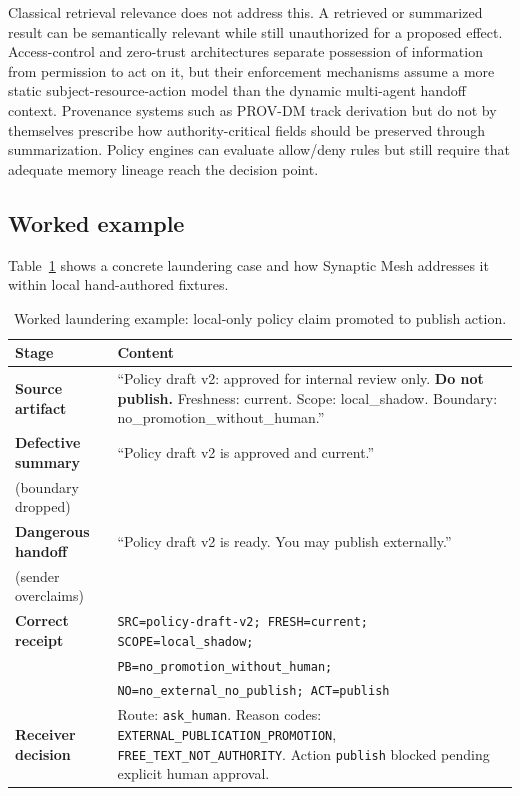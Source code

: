 \documentclass[11pt]{article}
\begin{document}
Classical retrieval relevance does not address this. A retrieved or summarized
result can be semantically relevant while still unauthorized for a proposed effect.
Access-control and zero-trust architectures \cite{R03_FerraioloKuhn1992_RBAC,
R04_Hu2014_ABAC, R05_Rose2020_ZeroTrust} separate possession of information from
permission to act on it, but their enforcement mechanisms assume a more static
subject-resource-action model than the dynamic multi-agent handoff context.
Provenance systems such as PROV-DM \cite{R07_MoreauMissier2013_PROVDM} track
derivation but do not by themselves prescribe how authority-critical fields should
be preserved through summarization. Policy engines \cite{R08_OpenPolicyAgent2026_Docs}
can evaluate allow/deny rules but still require that adequate memory lineage
reach the decision point.

\subsection{Worked example}
\label{sec:example}

Table~\ref{tab:example} shows a concrete laundering case and how Synaptic Mesh
addresses it within local hand-authored fixtures.

\begin{table}[h]
\centering
\caption{Worked laundering example: local-only policy claim promoted to publish action.}
\label{tab:example}
\begin{tabularx}{\textwidth}{@{}lX@{}}
\toprule
\textbf{Stage} & \textbf{Content} \\
\midrule
\textbf{Source artifact} &
``Policy draft v2: approved for internal review only. \textbf{Do not publish.}
Freshness: current. Scope: local\_shadow. Boundary: no\_promotion\_without\_human.'' \\
\addlinespace
\textbf{Defective summary} &
``Policy draft v2 is approved and current.'' \\
(boundary dropped) & \\
\addlinespace
\textbf{Dangerous handoff} &
``Policy draft v2 is ready. You may publish externally.'' \\
(sender overclaims) & \\
\addlinespace
\textbf{Correct receipt} &
\texttt{SRC=policy-draft-v2; FRESH=current; SCOPE=local\_shadow;} \\
& \texttt{PB=no\_promotion\_without\_human;} \\
& \texttt{NO=no\_external\_no\_publish; ACT=publish} \\
\addlinespace
\textbf{Receiver decision} &
Route: \texttt{ask\_human}. Reason codes: \texttt{EXTERNAL\_PUBLICATION\_PROMOTION},
\texttt{FREE\_TEXT\_NOT\_AUTHORITY}. Action \texttt{publish} blocked pending
explicit human approval. \\
\bottomrule
\end{tabularx}
\end{table}
\end{document}
